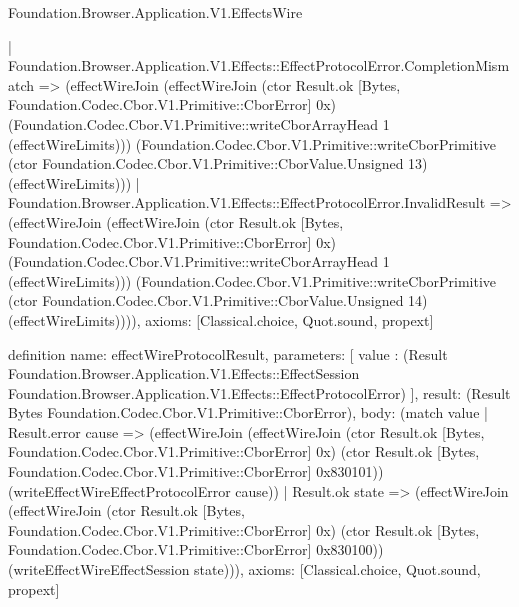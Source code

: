 \begin{lexlean}{Foundation.Browser.Application.V1.EffectsWire}
\begin{semanticmodule}
{    | Foundation.Browser.Application.V1.Effects::EffectProtocolError.CompletionMismatch => (effectWireJoin (effectWireJoin (ctor Result.ok [Bytes, Foundation.Codec.Cbor.V1.Primitive::CborError] 0x) (Foundation.Codec.Cbor.V1.Primitive::writeCborArrayHead 1 (effectWireLimits))) (Foundation.Codec.Cbor.V1.Primitive::writeCborPrimitive (ctor Foundation.Codec.Cbor.V1.Primitive::CborValue.Unsigned 13) (effectWireLimits)))
    | Foundation.Browser.Application.V1.Effects::EffectProtocolError.InvalidResult => (effectWireJoin (effectWireJoin (ctor Result.ok [Bytes, Foundation.Codec.Cbor.V1.Primitive::CborError] 0x) (Foundation.Codec.Cbor.V1.Primitive::writeCborArrayHead 1 (effectWireLimits))) (Foundation.Codec.Cbor.V1.Primitive::writeCborPrimitive (ctor Foundation.Codec.Cbor.V1.Primitive::CborValue.Unsigned 14) (effectWireLimits)))),
  axioms: [Classical.choice, Quot.sound, propext]
}

definition{
  name: effectWireProtocolResult,
  parameters: [
    value : (Result Foundation.Browser.Application.V1.Effects::EffectSession Foundation.Browser.Application.V1.Effects::EffectProtocolError)
  ],
  result: (Result Bytes Foundation.Codec.Cbor.V1.Primitive::CborError),
  body: (match value
    | Result.error cause => (effectWireJoin (effectWireJoin (ctor Result.ok [Bytes, Foundation.Codec.Cbor.V1.Primitive::CborError] 0x) (ctor Result.ok [Bytes, Foundation.Codec.Cbor.V1.Primitive::CborError] 0x830101)) (writeEffectWireEffectProtocolError cause))
    | Result.ok state => (effectWireJoin (effectWireJoin (ctor Result.ok [Bytes, Foundation.Codec.Cbor.V1.Primitive::CborError] 0x) (ctor Result.ok [Bytes, Foundation.Codec.Cbor.V1.Primitive::CborError] 0x830100)) (writeEffectWireEffectSession state))),
  axioms: [Classical.choice, Quot.sound, propext]
}


\end{semanticmodule}
\end{lexlean}
